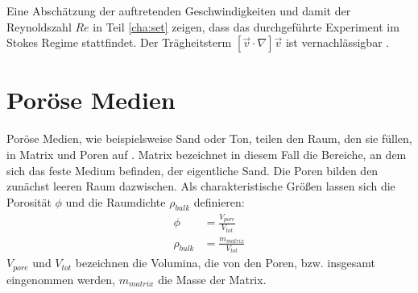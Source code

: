 Eine Abschätzung der auftretenden Geschwindigkeiten und damit der Reynoldszahl $Re$ in Teil \ref{cha:set} zeigen, dass das durchgeführte Experiment im Stokes Regime stattfindet. Der Trägheitsterm $\left[ \vec{v} \cdot \nabla \right] \vec{v}$  ist vernachlässigbar \citep{roth2005}.






\section{Poröse Medien}
\label{sec:por}

Poröse Medien, wie beispielsweise Sand oder Ton, teilen den Raum, den sie füllen, in Matrix und Poren auf \citep{roth2005}.  Matrix bezeichnet in diesem Fall die Bereiche, an dem sich das feste Medium befinden, der eigentliche Sand. Die Poren bilden den zunächst leeren Raum dazwischen.
Als charakteristische Größen lassen sich die Porosität $\phi$ und die Raumdichte $\rho_{bulk}$ definieren:
\begin{align}
 \phi &= \frac{V_{pore}}{V_{tot}} \\
 \rho_{bulk} &= \frac{m_{matrix}}{V_{tot}} %
\end{align}
$V_{pore}$ und $V_{tot}$ bezeichnen die Volumina, die von den Poren, bzw. insgesamt eingenommen werden, $m_{matrix}$ die Masse der Matrix. 

